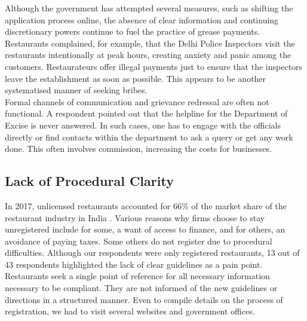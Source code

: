 \documentclass[a4paper, 12pt, twoside]{article}
\begin{document}
		Although the government has attempted several measures, such as shifting the application process online, the absence of clear information and continuing discretionary powers continue to fuel the practice of grease payments. Restaurants complained, 
for example, that the Delhi Police Inspectors visit the restaurants intentionally at peak hours, creating anxiety and panic among the customers. Restaurateurs offer illegal payments just to ensure that the inspectors leave the establishment as soon as possible. This 
appears to be another systematised manner of seeking bribes.\\

Formal channels of communication and grievance redressal are often not functional. A respondent pointed out that the helpline for the Department of Excise is never answered. In such cases, one has to engage with the officials directly or find contacts within the department to ask a query or get any work done. This often involves commission, increasing the costs for businesses.

		\subsection {Lack of Procedural Clarity}
		In 2017, unlicensed restaurants accounted for 66\% of the market share of the restaurant industry in India \parencite{ficci2017foodservindustry}. Various reasons why firms choose to stay unregistered include for some, a want of access to finance, and for others, an avoidance 
of paying taxes. Some others do not register due to procedural difficulties. Although our respondents were only registered restaurants, 13 out of 43 respondents highlighted the lack of clear guidelines as a pain point. Restaurants seek a single point of reference for 
all necessary information necessary to be compliant. They are not informed of the new guidelines or directions in a structured manner. Even to compile details on the process of registration, we had to visit several websites and government offices.\\
		
\end{document}
